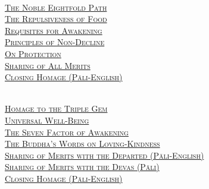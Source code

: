 {  \clearpage

  {\libertinusFont\selectfont\textbf{\textsc{\fontsize{18}{12}\selectfont{}}}}\\

  \textsc{\fontsize{14.4}{28}\selectfont
    \hyperref[noble-eightfold-path]{The Noble Eightfold Path} \ifdesktopversion\else\pageref{noble-eightfold-path}\fi\\
    \hyperref[repulsiveness-of-food]{The Repulsiveness of Food} \ifdesktopversion\else\pageref{repulsiveness-of-food}\fi\\
    \hyperref[requisites-for-awakening]{Requisites for Awakening} \ifdesktopversion\else\pageref{requisites-for-awakening}\fi\\
    \hyperref[principles-of-non-decline]{Principles of Non-Decline} \ifdesktopversion\else\pageref{principles-of-non-decline}\fi\\
    \hyperref[protection]{On Protection} \ifdesktopversion\else\pageref{protection}\fi\\
    \hyperref[sharing-all-merits]{Sharing of All Merits} \ifdesktopversion\else\pageref{sharing-all-merits}\fi\\
    \hyperref[closing-homage]{Closing Homage (Pāli-English)} \ifdesktopversion\else\pageref{closing-homage}\fi\\
  }

  \vspace{1.0cm}

  {\libertinusFont\selectfont\textbf{\textsc{\fontsize{18}{12}\selectfont{}}}}\\

  \textsc{\fontsize{14.4}{28}\selectfont
    \hyperref[dedication-of-offerings]{Homage to the Triple Gem} \ifdesktopversion\else\pageref{dedication-of-offerings}\fi\\
    \hyperref[universal-well-being]{Universal Well-Being} \ifdesktopversion\else\pageref{universal-well-being}\fi\\
    \hyperref[seven-factors-of-awakening]{The Seven Factor of Awakening} \ifdesktopversion\else\pageref{seven-factors-of-awakening}\fi\\
    \hyperref[words-on-loving-kindness]{The Buddha's Words on Loving-Kindness} \ifdesktopversion\else\pageref{words-on-loving-kindness}\fi\\
    \hyperref[sharing-merits-departed]{Sharing of Merits with the Departed (Pāli-English)} \ifdesktopversion\else\pageref{sharing-merits-departed}\fi\\
    \hyperref[sharing-merits-devas]{Sharing of Merits with the Devas (Pāli)} \ifdesktopversion\else\pageref{sharing-merits-devas}\fi\\
    \hyperref[closing-homage]{Closing Homage (Pāli-English)} \ifdesktopversion\else\pageref{closing-homage}\fi\\
  }

}
